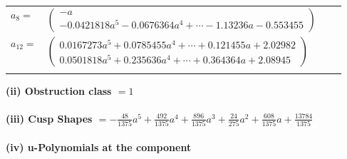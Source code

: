\documentclass[1p]{elsarticle_modified}
\theoremstyle{definition}
\begin{document}
\begin{tabular}{m{7pt} m{180pt} m{7pt} m{180pt} }
\flushright $a_{8}=$&$\begin{pmatrix}- a\\-0.0421818 a^{5}-0.0676364 a^{4}+\cdots-1.13236 a-0.553455\end{pmatrix}$ \\
\flushright $a_{12}=$&$\begin{pmatrix}0.0167273 a^{5}+0.0785455 a^{4}+\cdots+0.121455 a+2.02982\\0.0501818 a^{5}+0.235636 a^{4}+\cdots+0.364364 a+2.08945\end{pmatrix}$\\&\end{tabular}
\flushleft \textbf{(ii) Obstruction class $= 1$}\\~\\
\flushleft \textbf{(iii) Cusp Shapes $= -\frac{48}{1375} a^5+\frac{492}{1375} a^4+\frac{896}{1375} a^3+\frac{24}{275} a^2+\frac{608}{1375} a+\frac{13784}{1375}$}\\~\\
\newpage\renewcommand{\arraystretch}{1}
\flushleft \textbf{(iv) u-Polynomials at the component}\newline \\
\end{document}
